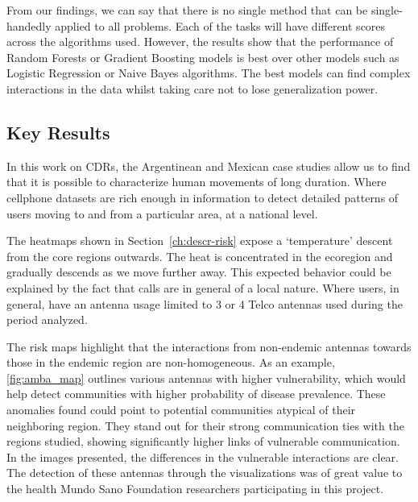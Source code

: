 From our findings, we can say that there is no single method that can be single-handedly applied to all problems.
Each of the tasks will have different scores across the algorithms used.
However, the results show that the performance of Random Forests or Gradient Boosting models is best over other models such as Logistic Regression or Naive Bayes algorithms.
The best models can find complex interactions in the data whilst taking care not to lose generalization power.


\subsection{Key Results}



In this work on CDRs, the Argentinean and Mexican case studies allow us to find that it is possible to characterize human movements of long duration.
Where cellphone datasets are rich enough in information to detect detailed patterns of users moving to and from a particular area, at a national level.




The heatmaps shown in Section~\cref{ch:descr-risk} expose a `temperature' descent from the core regions outwards.
The heat is concentrated in the ecoregion and gradually descends as we move further away.
This expected behavior could be explained by the fact that calls are in general of a local nature.
Where users, in general, have an antenna usage limited to 3 or 4 Telco antennas used during the period analyzed.

The risk maps highlight that the interactions from non-endemic antennas towards those in the endemic region are non-homogeneous.
As an example, \cref{fig:amba_map} outlines various antennas with higher vulnerability, which would help detect communities with higher probability of disease prevalence.
These anomalies found could point to potential communities atypical of their neighboring region.
They stand out for their strong communication ties with the regions studied, showing significantly higher links of vulnerable communication.
In the images presented, the differences in the vulnerable interactions are clear.
The detection of these antennas through the visualizations was of great value to the health Mundo Sano Foundation researchers participating in this project.






